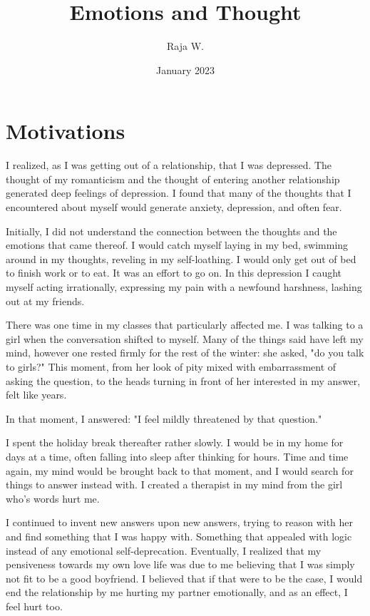 \documentclass{book}
\begin{document}
\frontmatter

\title{Emotions and Thought}
\author{Raja W.}
\date{January 2023}
\maketitle

\mainmatter
\chapter{Motivations}

I realized, as I was getting out of a relationship, that I was depressed. The
thought of my romanticism and the thought of entering another relationship
generated deep feelings of depression. I found that many of the thoughts that I
encountered about myself would generate anxiety, depression, and often fear.

Initially, I did not understand the connection between the thoughts and the
emotions that came thereof. I would catch myself laying in my bed, swimming
around in my thoughts, reveling in my self-loathing. I would only get out of bed
to finish work or to eat. It was an effort to go on. In this depression I caught
myself acting irrationally, expressing my pain with a newfound harshness,
lashing out at my friends.

There was one time in my classes that particularly affected me. I was talking to
a girl when the conversation shifted to myself. Many of the things said have
left my mind, however one rested firmly for the rest of the winter: she asked,
"do you talk to girls?" This moment, from her look of pity mixed with
embarrassment of asking the question, to the heads turning in front of her
interested in my answer, felt like years. 

In that moment, I answered: "I feel mildly threatened by that
question."

I spent the holiday break thereafter rather slowly. I would be in my home for
days at a time, often falling into sleep after thinking for hours. Time and time
again, my mind would be brought back to that moment, and I would search for
things to answer instead with. I created a therapist in my mind from the girl
who's words hurt me.

I continued to invent new answers upon new answers, trying to reason with her
and find something that I was happy with. Something that appealed with logic
instead of any emotional self-deprecation. Eventually, I realized that my
pensiveness towards my own love life was due to me believing that I was simply
not fit to be a good boyfriend. I believed that if that were to be the case, I
would end the relationship by me hurting my partner emotionally, and as an
effect, I feel hurt too.
\end{document}
